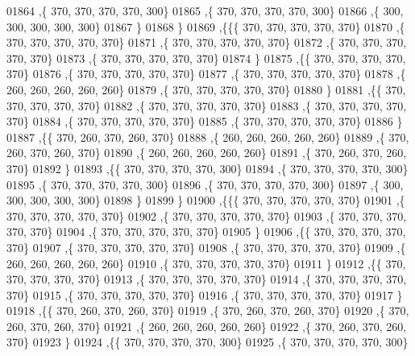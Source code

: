 \begin{DoxyCode}
01864    ,\{   370,   370,   370,   370,   300\}
01865    ,\{   370,   370,   370,   370,   300\}
01866    ,\{   300,   300,   300,   300,   300\}
01867    \}
01868   \}
01869  ,\{\{\{   370,   370,   370,   370,   370\}
01870    ,\{   370,   370,   370,   370,   370\}
01871    ,\{   370,   370,   370,   370,   370\}
01872    ,\{   370,   370,   370,   370,   370\}
01873    ,\{   370,   370,   370,   370,   370\}
01874    \}
01875   ,\{\{   370,   370,   370,   370,   370\}
01876    ,\{   370,   370,   370,   370,   370\}
01877    ,\{   370,   370,   370,   370,   370\}
01878    ,\{   260,   260,   260,   260,   260\}
01879    ,\{   370,   370,   370,   370,   370\}
01880    \}
01881   ,\{\{   370,   370,   370,   370,   370\}
01882    ,\{   370,   370,   370,   370,   370\}
01883    ,\{   370,   370,   370,   370,   370\}
01884    ,\{   370,   370,   370,   370,   370\}
01885    ,\{   370,   370,   370,   370,   370\}
01886    \}
01887   ,\{\{   370,   260,   370,   260,   370\}
01888    ,\{   260,   260,   260,   260,   260\}
01889    ,\{   370,   260,   370,   260,   370\}
01890    ,\{   260,   260,   260,   260,   260\}
01891    ,\{   370,   260,   370,   260,   370\}
01892    \}
01893   ,\{\{   370,   370,   370,   370,   300\}
01894    ,\{   370,   370,   370,   370,   300\}
01895    ,\{   370,   370,   370,   370,   300\}
01896    ,\{   370,   370,   370,   370,   300\}
01897    ,\{   300,   300,   300,   300,   300\}
01898    \}
01899   \}
01900  ,\{\{\{   370,   370,   370,   370,   370\}
01901    ,\{   370,   370,   370,   370,   370\}
01902    ,\{   370,   370,   370,   370,   370\}
01903    ,\{   370,   370,   370,   370,   370\}
01904    ,\{   370,   370,   370,   370,   370\}
01905    \}
01906   ,\{\{   370,   370,   370,   370,   370\}
01907    ,\{   370,   370,   370,   370,   370\}
01908    ,\{   370,   370,   370,   370,   370\}
01909    ,\{   260,   260,   260,   260,   260\}
01910    ,\{   370,   370,   370,   370,   370\}
01911    \}
01912   ,\{\{   370,   370,   370,   370,   370\}
01913    ,\{   370,   370,   370,   370,   370\}
01914    ,\{   370,   370,   370,   370,   370\}
01915    ,\{   370,   370,   370,   370,   370\}
01916    ,\{   370,   370,   370,   370,   370\}
01917    \}
01918   ,\{\{   370,   260,   370,   260,   370\}
01919    ,\{   370,   260,   370,   260,   370\}
01920    ,\{   370,   260,   370,   260,   370\}
01921    ,\{   260,   260,   260,   260,   260\}
01922    ,\{   370,   260,   370,   260,   370\}
01923    \}
01924   ,\{\{   370,   370,   370,   370,   300\}
01925    ,\{   370,   370,   370,   370,   300\}

\end{DoxyCode}
